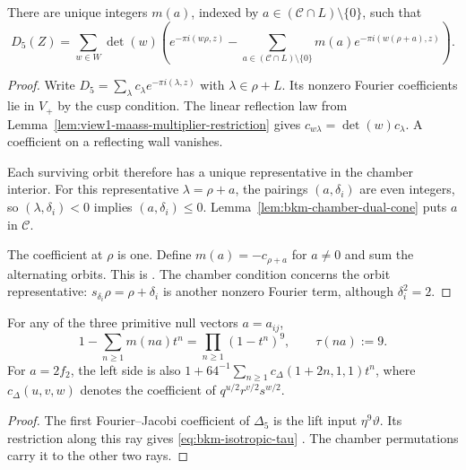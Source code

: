 \begin{theorem}
\label{thm:bkm-weyl-alternating-sum}
There are unique integers $m(a)$, indexed by
$a\in(\mathcal C\cap L)\setminus\{0\}$, such that
\begin{equation}
\label{eq:bkm-weyl-sum-Delta5}
 D_5(Z)=\sum_{w\in W}\det(w)
 \left(e^{-\pi i(w\rho,z)}-
       \sum_{a\in(\mathcal C\cap L)\setminus\{0\}}
         m(a)e^{-\pi i(w(\rho+a),z)}\right).
\end{equation}
\end{theorem}
\begin{proof}
Write $D_5=\sum_\lambda c_\lambda e^{-\pi i(\lambda,z)}$ with
$\lambda\in\rho+L$. Its nonzero Fourier coefficients lie in $V_+$
by the cusp condition. The linear reflection law from
Lemma~\ref{lem:view1-maass-multiplier-restriction} gives
$c_{w\lambda}=\det(w)c_\lambda$. A coefficient on a reflecting
wall vanishes.

Each surviving orbit therefore has a unique
representative in the chamber interior. For this representative
$\lambda=\rho+a$, the pairings $(a,\delta_i)$ are even integers,
so $(\lambda,\delta_i)<0$ implies $(a,\delta_i)\leq0$.
Lemma~\ref{lem:bkm-chamber-dual-cone} puts $a$ in $\mathcal C$.

The coefficient at $\rho$ is one. Define $m(a)=-c_{\rho+a}$ for
$a\ne0$ and sum the alternating orbits. This is
\cite[Theorem~2.3(a)]{GN}. The chamber condition concerns the orbit
representative: $s_{\delta_i}\rho=\rho+\delta_i$ is another
nonzero Fourier term, although $\delta_i^2=2$.
\end{proof}

\begin{lemma}
\label{lem:bkm-isotropic-eta-product}
For any of the three primitive null vectors $a=a_{ij}$,
\begin{equation}
\label{eq:bkm-isotropic-tau}
 1-\sum_{n\geq1}m(na)t^n
 =\prod_{n\geq1}(1-t^n)^9,
 \qquad \tau(na):=9.
\end{equation}
For $a=2f_2$, the left side is also
$1+64^{-1}\sum_{n\geq1}c_\Delta(1+2n,1,1)t^n$, where
$c_\Delta(u,v,w)$ denotes the coefficient of $q^{u/2}r^{v/2}s^{w/2}$.
\end{lemma}
\begin{proof}
The first Fourier--Jacobi coefficient of $\Delta_5$ is the lift
input $\eta^9\vartheta$. Its restriction along this ray gives
\eqref{eq:bkm-isotropic-tau} \cite[Section~3]{GN}.
The chamber permutations carry it to the other two rays.
\end{proof}

